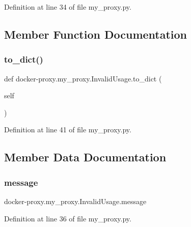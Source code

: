 Definition at line 34 of file my\+\_\+proxy.\+py.



\subsection{Member Function Documentation}
\hypertarget{classdocker-proxy_1_1my__proxy_1_1_invalid_usage_a50b7849f7141fc1455ace3691a9417a7}{}\label{classdocker-proxy_1_1my__proxy_1_1_invalid_usage_a50b7849f7141fc1455ace3691a9417a7} 
\subsubsection{\texorpdfstring{to\+\_\+dict()}{to\_dict()}}
{\footnotesize\ttfamily def docker-\/proxy.\+my\+\_\+proxy.\+Invalid\+Usage.\+to\+\_\+dict (\begin{DoxyParamCaption}\item[{}]{self }\end{DoxyParamCaption})}



Definition at line 41 of file my\+\_\+proxy.\+py.



\subsection{Member Data Documentation}
\hypertarget{classdocker-proxy_1_1my__proxy_1_1_invalid_usage_aa61d504376bb9479db82cb7d97c70011}{}\label{classdocker-proxy_1_1my__proxy_1_1_invalid_usage_aa61d504376bb9479db82cb7d97c70011} 
\subsubsection{\texorpdfstring{message}{message}}
{\footnotesize\ttfamily docker-\/proxy.\+my\+\_\+proxy.\+Invalid\+Usage.\+message}



Definition at line 36 of file my\+\_\+proxy.\+py.

